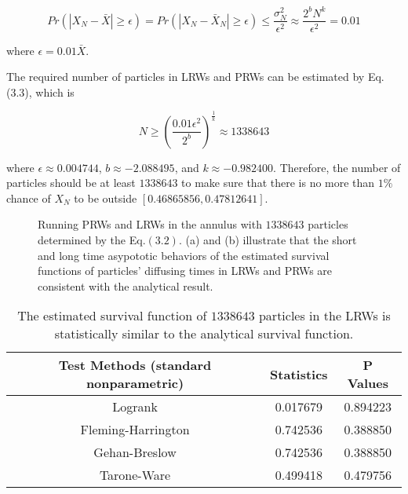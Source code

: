 \begin{equation}
  Pr(|X_{N} - \bar X| \geq \epsilon) = Pr(|X_{N} - \bar X_{N}| \geq
  \epsilon) \leq \frac{\sigma^2_{N}}{\epsilon^2} \approx \frac{2^b
    N^k}{\epsilon^2} = 0.01
\end{equation}

where $\epsilon = 0.01 \bar X$.

The required number of particles in LRWs and PRWs can be estimated by
Eq.(3.3), which is

\begin{equation}
  N \geq (\frac{0.01 \epsilon^2}{2^b})^{\frac{1}{k}} \approx 1338643
\end{equation}

where $\epsilon \approx 0.004744$, $b \approx -2.088495$, and $k
\approx -0.982400$. Therefore, the number of particles should be at
least $1338643$ to make sure that there is no more than $1\%$ chance
of $X_N$ to be outside $[0.46865856, 0.47812641]$.


\clearpage

\begin{figure}[h!]
  \centering
  \qquad
  \caption{Running PRWs and LRWs in the annulus with $1338643$
    particles determined by the Eq.$(3.2)$.  (a) and (b) illustrate
    that the short and long time asypototic behaviors of the estimated
    survival functions of particles' diffusing times in LRWs and PRWs
    are consistent with the analytical result.}
\end{figure}

\clearpage


\begin{table}[h!]
  \centering
  \begin{tabular}{|c|c|c|}\hline
    Test Methods (standard nonparametric) & Statistics & P Values \\
    \hline
    Logrank & 0.017679 & 0.894223 \\
    \hline
    Fleming-Harrington & 0.742536 & 0.388850 \\
    \hline
    Gehan-Breslow & 0.742536 & 0.388850 \\
    \hline
    Tarone-Ware & 0.499418 & 0.479756 \\
    \hline
  \end{tabular}
  \caption{The estimated survival function of $1338643$ particles in
    the LRWs is statistically similar to the analytical survival
    function. }
\end{table}


